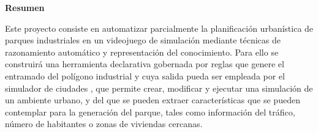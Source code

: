 \vspace*{4em}
{\Huge\bfseries{Resumen}\par}
\vspace*{2em}
{Este proyecto consiste en automatizar parcialmente la planificación urbanística de parques industriales en un videojuego de simulación mediante técnicas de razonamiento automático y representación del conocimiento. Para ello se construirá una herramienta declarativa gobernada por reglas que genere el entramado del polígono industrial y cuya salida pueda ser empleada por el simulador de ciudades \cities, que permite crear, modificar y ejecutar una simulación de un ambiente urbano, y del que se pueden extraer características que se pueden contemplar para la generación del parque, tales como información del tráfico, número de habitantes o zonas de viviendas cercanas.\par}
\vspace*{\fill}